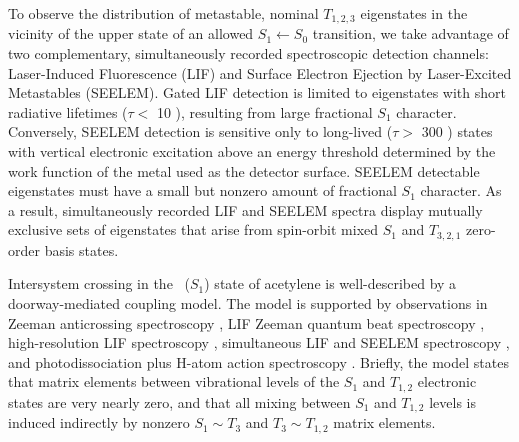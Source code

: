 To observe the distribution of metastable, nominal $T_{1,2,3}$
eigenstates in the vicinity of the upper state of an allowed $S_1
\leftarrow S_0$ transition, we take advantage of two complementary,
simultaneously recorded spectroscopic detection channels:
Laser-Induced Fluorescence (LIF) and Surface Electron Ejection by
Laser-Excited Metastables (SEELEM).  Gated LIF detection is limited to
eigenstates with short radiative lifetimes ($\tau <$ 10 \microsec),
resulting from large fractional $S_1$ character.  Conversely, SEELEM
detection is sensitive only to long-lived ($\tau >$ 300 \microsec)
states with vertical electronic excitation above an energy threshold
determined by the work function of the metal used as the detector
surface.  SEELEM detectable eigenstates must have a small but nonzero
amount of fractional $S_1$ character.  As a result, simultaneously
recorded LIF and SEELEM spectra display mutually exclusive sets of
eigenstates that arise from spin-orbit mixed $S_1$ and $T_{3,2,1}$
zero-order basis states.

Intersystem crossing in the \astate\ ($S_1$) state of acetylene is
well-described by a doorway-mediated coupling model.  The model is
supported by observations in Zeeman anticrossing spectroscopy
\cite{dupre91, dupre95a, dupre95b}, LIF Zeeman quantum beat
spectroscopy \cite{ochi87, ochi91, dupre93}, high-resolution LIF
spectroscopy \cite{drabbels94, altunata01}, simultaneous LIF and
SEELEM spectroscopy \cite{humphrey97, altunata00, mishra04}, and
photodissociation plus H-atom action spectroscopy \cite{yamakita03,
  loffler98, mordaunt98}.  Briefly, the model states that matrix
elements between vibrational levels of the $S_1$ and $T_{1,2}$
electronic states are very nearly zero, and that all mixing between
$S_1$ and $T_{1,2}$ levels is induced indirectly by nonzero $S_1 \sim
T_3$ and $T_3 \sim T_{1,2}$ matrix elements.


